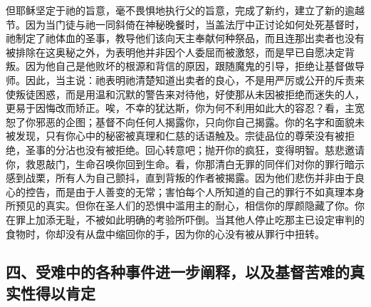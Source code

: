 但耶稣坚定于祂的旨意，毫不畏惧地执行父的旨意，完成了新约，建立了新的逾越节。因为当门徒与祂一同斜倚在神秘晚餐时，当盖法厅中正讨论如何处死基督时，祂制定了祂体血的圣事，教导他们该向天主奉献何种祭品，而且连那出卖者也没有被排除在这奥秘之外，为表明他并非因个人委屈而被激怒，而是早已自愿决定背叛。因为他自己是他败坏的根源和背信的原因，跟随魔鬼的引导，拒绝让基督做导师。因此，当主说：祂表明祂清楚知道出卖者的良心，不是用严厉或公开的斥责来使叛徒困惑，而是用温和沉默的警告来对待他，好使那从未因被拒绝而迷失的人，更易于因悔改而矫正。唉，不幸的犹达斯，你为何不利用如此大的容忍？看，主宽恕了你邪恶的企图；基督不向任何人揭露你，只向你自己揭露。你的名字和面貌未被发现，只有你心中的秘密被真理和仁慈的话语触及。宗徒品位的尊荣没有被拒绝，圣事的分沾也没有被拒绝。回心转意吧；抛开你的疯狂，变得明智。慈悲邀请你，救恩敲门，生命召唤你回到生命。看，你那清白无罪的同伴们对你的罪行暗示感到战栗，所有人为自己颤抖，直到背叛的作者被揭露。因为他们悲伤并非由于良心的控告，而是由于人善变的无常；害怕每个人所知道的自己的罪行不如真理本身所预见的真实。但你在圣人们的恐惧中滥用主的耐心，相信你的厚颜隐藏了你。你在罪上加添无耻，不被如此明确的考验所吓倒。当其他人停止吃那主已设定审判的食物时，你却没有从盘中缩回你的手，因为你的心没有被从罪行中扭转。\par


\subsection{四、受难中的各种事件进一步阐释，以及基督苦难的真实性得以肯定}

